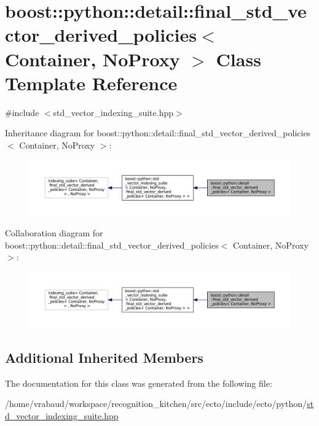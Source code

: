 \hypertarget{classboost_1_1python_1_1detail_1_1final__std__vector__derived__policies}{}\section{boost\+:\+:python\+:\+:detail\+:\+:final\+\_\+std\+\_\+vector\+\_\+derived\+\_\+policies$<$ Container, No\+Proxy $>$ Class Template Reference}
\label{classboost_1_1python_1_1detail_1_1final__std__vector__derived__policies}


{\ttfamily \#include $<$std\+\_\+vector\+\_\+indexing\+\_\+suite.\+hpp$>$}



Inheritance diagram for boost\+:\+:python\+:\+:detail\+:\+:final\+\_\+std\+\_\+vector\+\_\+derived\+\_\+policies$<$ Container, No\+Proxy $>$\+:\nopagebreak
\begin{figure}[H]
\begin{center}
\leavevmode
\includegraphics[width=350pt]{classboost_1_1python_1_1detail_1_1final__std__vector__derived__policies__inherit__graph}
\end{center}
\end{figure}


Collaboration diagram for boost\+:\+:python\+:\+:detail\+:\+:final\+\_\+std\+\_\+vector\+\_\+derived\+\_\+policies$<$ Container, No\+Proxy $>$\+:\nopagebreak
\begin{figure}[H]
\begin{center}
\leavevmode
\includegraphics[width=350pt]{classboost_1_1python_1_1detail_1_1final__std__vector__derived__policies__coll__graph}
\end{center}
\end{figure}
\subsection*{Additional Inherited Members}


The documentation for this class was generated from the following file\+:\begin{DoxyCompactItemize}
\item 
/home/vrabaud/workspace/recognition\+\_\+kitchen/src/ecto/include/ecto/python/\hyperlink{std__vector__indexing__suite_8hpp}{std\+\_\+vector\+\_\+indexing\+\_\+suite.\+hpp}\end{DoxyCompactItemize}
